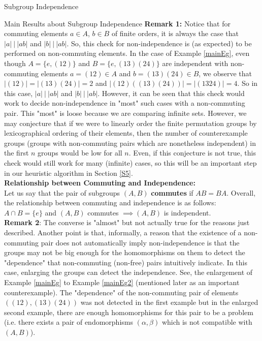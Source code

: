 \documentclass{article}
\begin{document}
\begin{section}{Subgroup Independence}
\begin{subsection}{Main Results about Subgroup Independence}
			\noindent \textbf{Remark 1:} Notice that for commuting elements $a \in A$, $b\in B$ of finite orders, it is always the case that $|a|\  | \ |ab|$ and $|b| \ | \ |ab|$. So, this check for non-independence is (as expected) to be performed on non-commuting elements. In the case of Example \ref{mainEg}, even though $A = \{e, (12)\}$ and $B = \{e, (13)(24)\}$ are independent with non-commuting elements $a= (12) \in A$ and $ b=(13)(24) \in B$, we observe that $|(12)| = |(13)(24)| = 2$  and $|(12)((13)(24))|=|(1324)|=4$. So in this case, $|a| \ | \ |ab|$ and $|b| \ | \ |ab|$. However, it can be seen that this check would work to decide non-independence in "most" such cases with a non-commuting pair. This "most" is loose because we are comparing infinite sets. However, we may conjecture that if we were to linearly order the finite permutation groups by lexicographical ordering of their elements, then the number of counterexample groups (groups with non-commuting pairs which are nonetheless independent) in the first $n$ groups would be low for all $n$. Even, if this conjecture is not true, this check would still work for  many (infinite) cases, so this will be an important step in our heuristic algorithm in Section \ref{S5}.\\
			
			\noindent \textbf{Relationship between Commuting and Independence:}\\
			
			\noindent Let us say that the pair of subgroups $(A, B)$ \textbf{commutes} if $AB=BA$. Overall, the relationship between commuting and independence is as follows:  \\
			
			\noindent  $A \cap B = \{e\}$ and $(A,B)$  commutes  $\implies (A,B)$ is independent.\\
			
			\noindent \textbf{Remark 2}: The converse is "almost" but not actually true for the reasons just described. Another point is that, informally, a reason that the existence of a non-commuting pair does not automatically imply non-independence is that the groups may not be big enough for the homomorphisms on them to detect the "dependence" that non-commuting (non-free)  pairs intuitively indicate. In this case, enlarging the groups can detect the independence. See, the enlargement of Example \ref{mainEg} to  Example \ref{mainEg2} (mentioned later as an important counterexample). The "dependence" of the non-commuting pair of elements $((12), (13)(24))$ was not detected in the first example but in the enlarged second example, there are enough homomorphisms for this pair  to be a problem (i.e. there exists a pair of endomorphisms $(\alpha, \beta)$ which is not compatible with $(A, B)$).\\
			

\end{subsection}
\end{section}
\end{document}
